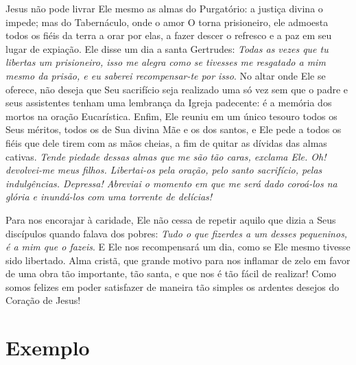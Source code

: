 Jesus não pode livrar Ele mesmo as almas do Purgatório: a justiça divina o impede; mas do Tabernáculo, onde o amor O torna prisioneiro, ele admoesta todos os fiéis da terra a orar por elas, a fazer descer o refresco e a paz em seu lugar de expiação. Ele disse um dia a santa Gertrudes: \textit{Todas as vezes que tu libertas um prisioneiro, isso me alegra como se tivesses me resgatado a mim mesmo da prisão, e eu saberei recompensar-te por isso}. No altar onde Ele se oferece, não deseja que Seu sacrifício seja realizado uma só vez sem que o padre e seus assistentes tenham uma lembrança da Igreja padecente: é a memória dos mortos na oração Eucarística. Enfim, Ele reuniu em um único tesouro todos os Seus méritos, todos os de Sua divina Mãe e os dos santos, e Ele pede a todos os fiéis que dele tirem com as mãos cheias, a fim de quitar as dívidas das almas cativas. \textit{Tende piedade dessas almas que me são tão caras, exclama Ele. Oh! devolvei-me meus filhos. Libertai-os pela oração, pelo santo sacrifício, pelas indulgências. Depressa! Abreviai o momento em que me será dado coroá-los na glória e inundá-los com uma torrente de delícias!}

Para nos encorajar à caridade, Ele não cessa de repetir aquilo que dizia a Seus discípulos quando falava dos pobres: \textit{Tudo o que fizerdes a um desses pequeninos, é a mim que o fazeis}. E Ele nos recompensará um dia, como se Ele mesmo tivesse sido libertado.
Alma cristã, que grande motivo para nos inflamar de zelo em favor de uma obra tão importante, tão santa, e que nos é tão fácil de realizar! Como somos felizes em poder satisfazer de maneira tão simples os ardentes desejos do Coração de Jesus! 


\section*{Exemplo}

